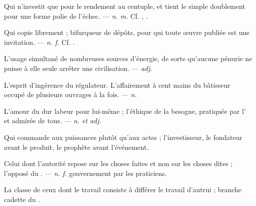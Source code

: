  Qui n'investit que pour le rendement au centuple, et tient le simple doublement pour une forme polie de l'échec.  ---  \textit{n. m.} Cf. , .

 Qui copie librement ; bifurqueur de dépôts, pour qui toute œuvre publiée est une invitation. ---  \textit{n. f.} Cf. .

 L'usage simultané de nombreuses sources d'énergie, de sorte qu'aucune pénurie ne puisse à elle seule arrêter une civilisation.  ---  \textit{adj.}

   L'esprit d'ingérence du régulateur.   L'affairement à cent mains du bâtisseur occupé de plusieurs ouvrages à la fois. ---  \textit{n.}

 L'amour du dur labeur pour lui-même ; l'éthique de la besogne, pratiquée par l' et admirée de tous. ---  \textit{n. et adj.}

 Qui commande aux puissances plutôt qu'aux actes ; l'investisseur, le fondateur avant le produit, le prophète avant l'événement.

 Celui dont l'autorité repose sur les choses faites et non sur les choses dites ; l'opposé du . ---  \textit{n. f.} gouvernement par les praticiens.

 La classe de ceux dont le travail consiste à différer le travail d'autrui ; branche cadette du .

